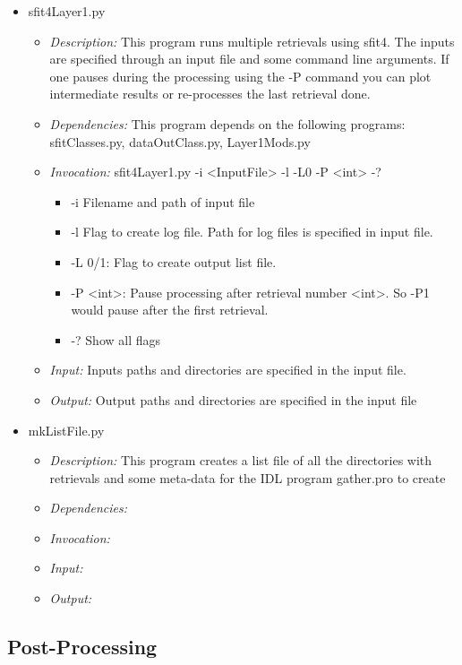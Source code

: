 \documentclass[12pt, letterpaper]{article}
\begin{document}
\begin{itemize}
\item sfit4Layer1.py
\begin{itemize} 
\item \textit{Description:} This program runs multiple retrievals using sfit4. The inputs are specified through an input file and some command line arguments. If one pauses during the processing using the -P command you can plot intermediate results or re-processes the last retrieval done.
\item \textit{Dependencies:} This program depends on the following programs: sfitClasses.py, dataOutClass.py, Layer1Mods.py
\item \textit{Invocation:} sfit4Layer1.py -i <InputFile> -l -L0 -P <int> -?
\begin{itemize}
\item -i Filename and path of input file
\item -l Flag to create log file. Path for log files is specified in input file.
\item -L 0/1: Flag to create output list file. 
\item -P <int>: Pause processing after retrieval number <int>. So -P1 would pause after the first retrieval.
\item -? Show all flags
\end{itemize}
\item \textit{Input:} Inputs paths and directories are specified in the input file.
\item \textit{Output:} Output paths and directories are specified in the input file
\end{itemize}
\end{itemize}

\begin{itemize}
\item mkListFile.py
\begin{itemize}
\item \textit{Description:} This program creates a list file of all the directories with retrievals and some meta-data for the IDL program gather.pro to create
\item \textit{Dependencies:} 
\item \textit{Invocation:} 
\item \textit{Input:} 
\item \textit{Output:}
\end{itemize}
\end{itemize}


\subsection{Post-Processing}
\end{document}
